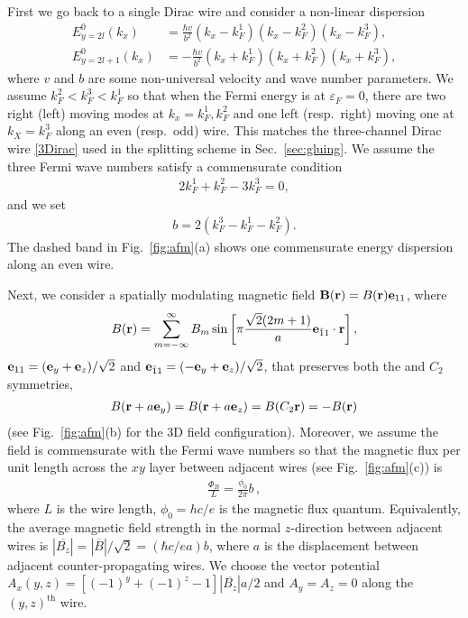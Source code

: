 First we go back to a single Dirac wire and consider a non-linear dispersion \begin{align}E^0_{y=2l}(k_x)&=\frac{\hbar v}{b^2}(k_x-k_F^1)(k_x-k_F^2)(k_x-k_F^3),\nonumber\\E^0_{y=2l+1}(k_x)&=-\frac{\hbar v}{b^2}(k_x+k_F^1)(k_x+k_F^2)(k_x+k_F^3),\end{align} where $v$ and $b$ are some non-universal velocity and wave number parameters. We assume $k_F^2<k_F^3<k_F^1$ so that when the Fermi energy is at $\varepsilon_F=0$, there are two right (left) moving modes at $k_x=k_F^1,k_F^2$ and one left (resp.~right) moving one at $k_X=k_F^3$ along an even (resp.~odd) wire. This matches the three-channel Dirac wire \eqref{3Dirac} used in the splitting scheme in Sec.~\ref{sec:gluing}. We assume the three Fermi wave numbers satisfy a commensurate condition \begin{align}2k_F^1+k_F^2-3k_F^3=0,\label{kcomm}\end{align} and we set \begin{align}b=2(k_F^3-k_F^1-k_F^2).\label{bcomm1}\end{align} The dashed band in Fig.~\ref{fig:afm}(a) shows one commensurate energy dispersion along an even wire.

Next, we consider a spatially modulating magnetic field ${\bf B}({\bf r})=B({\bf r}){\bf e}_{11}$, where \begin{align}B({\bf r})=\sum_{m=-\infty}^\infty B_m\sin\left[\pi\frac{\sqrt{2}(2m+1)}{a}{\bf e}_{\bar{1}1}\cdot{\bf r}\right],\end{align} ${\bf e}_{11}=({\bf e}_y+{\bf e}_z)/\sqrt{2}$ and ${\bf e}_{\bar{1}1}=(-{\bf e}_y+{\bf e}_z)/\sqrt{2}$, that preserves both the \AFTR and $C_2$ symmetries, \begin{align}B({\bf r}+a{\bf e}_y)=B({\bf r}+a{\bf e}_z)=B(C_2{\bf r})=-B({\bf r})\end{align} (see Fig.~\ref{fig:afm}(b) for the 3D field configuration). Moreover, we assume the field is commensurate with the Fermi wave numbers so that the magnetic flux per unit length across the $xy$ layer between adjacent wires (see Fig.~\ref{fig:afm}(c)) is \begin{align}\frac{\Phi_B}{L}=\frac{\phi_0}{2\pi}b \,, \label{bcomm2}\end{align} where $L$ is the wire length, $\phi_0=hc/e$ is the magnetic flux quantum. Equivalently, the average magnetic field strength in the normal $z$-direction between adjacent wires is $|\overline{B_z}|=|\overline{B}|/\sqrt{2}=(\hbar c/ea)b$, where $a$ is the displacement between adjacent counter-propagating wires. We choose the vector potential $A_x(y,z)=[(-1)^y+(-1)^z-1]|\overline{B_z}|a/2$ and $A_y=A_z=0$ along the $(y,z)^{\mathrm{th}}$ wire. 

